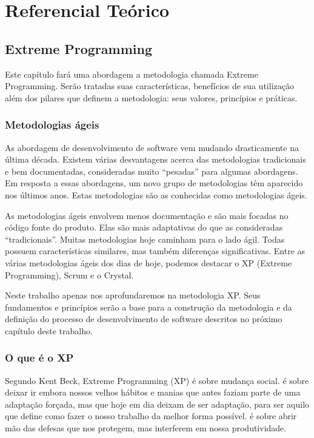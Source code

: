 \part{Referencial Teórico}

\chapter[Extreme Programming]{Extreme Programming}

Este capítulo fará uma abordagem a metodologia chamada Extreme Programming. Serão tratadas suas características, benefícios de sua utilização além dos pilares que definem a metodologia: seus valores, princípios e práticas.

\section{Metodologias ágeis}

As abordagem de desenvolvimento de software vem mudando drasticamente na última década. Existem várias desvantagens acerca das metodologias tradicionais e bem documentadas, consideradas muito “pesadas” para algumas abordagens. Em resposta a essas abordagens, um novo grupo de metodologias têm aparecido nos últimos anos. Estas metodologias são as conhecidas como metodologias ágeis. \cite{Agarwal:2008}

As metodologias ágeis envolvem menos documentação e são mais focadas no código fonte do produto. Elas são mais adaptativas do que as consideradas “tradicionais”. Muitas metodologias hoje caminham para o lado ágil. Todas possuem características similares, mas também diferenças significativas. Entre as várias metodologias ágeis dos dias de hoje, podemos destacar o XP (Extreme Programming), Scrum e o Crystal.

Neste trabalho apenas nos aprofundaremos na metodologia XP. Seus fundamentos e princípios serão a base para a construção da metodologia e da definição do processo de desenvolvimento de software descritos no próximo capítulo deste trabalho.

\section{O que é o XP}

Segundo Kent Beck, \cite{Beck:2004} Extreme Programming (XP) é sobre mudança social. é sobre deixar ir embora nossos velhos hábitos e manias que antes faziam parte de uma adaptação forçada, mas que hoje em dia deixam de ser adaptação, para ser aquilo que define como fazer o nosso trabalho da melhor forma possível. é sobre abrir mão das defesas que nos protegem, mas interferem em nossa produtividade.

